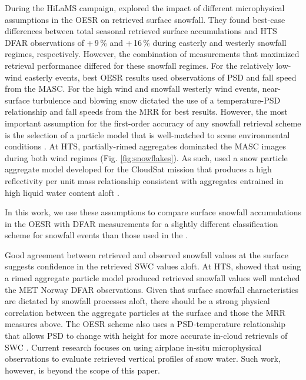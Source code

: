 \documentclass{ametsocV5}
\begin{document}
		
		During the HiLaMS campaign, \citet{schirle_estimation_2019} explored the impact of different microphysical assumptions in the OESR on retrieved surface snowfall. They found best-case differences between total seasonal retrieved surface accumulations and HTS DFAR observations of +\,9\,\% and +\,16\,\% during easterly and westerly snowfall regimes, respectively. However, the combination of measurements that maximized retrieval performance differed for these snowfall regimes. For the relatively low-wind easterly events, best OESR results used observations of PSD and fall speed from the MASC. For the high wind and snowfall westerly wind events, near-surface turbulence and blowing snow dictated the use of a temperature-PSD relationship and fall speeds from the MRR for best results. However, the most important assumption for the first-order accuracy of any snowfall retrieval scheme is the selection of a particle model that is well-matched to scene environmental conditions \citep{cooper_variational_2017,schirle_estimation_2019}. At HTS, partially-rimed aggregates dominated the MASC images during both wind regimes (Fig. \ref{fig:snowflakes}). As such, \citet{schirle_estimation_2019} used a snow particle aggregate model developed for the CloudSat mission that produces a high reflectivity per unit mass relationship consistent with aggregates entrained in high liquid water content aloft \citep{wood_microphysical_2015}.
		
		In this work, we use these assumptions to compare surface snowfall accumulations in the OESR with DFAR measurements for a slightly different classification scheme for snowfall events than those used in the \citet{schirle_estimation_2019}. 
		
		Good agreement between retrieved and observed snowfall values at the surface suggests confidence in the retrieved SWC values aloft. At HTS, \citet{schirle_estimation_2019} showed that using a rimed aggregate particle model produced retrieved snowfall values well matched the MET Norway DFAR observations. Given that surface snowfall characteristics are dictated by snowfall processes aloft, there should be a strong physical correlation between the aggregate particles at the surface and those the MRR measures above. The OESR scheme also uses a PSD-temperature relationship that allows PSD to change with height for more accurate in-cloud retrievals of SWC \citep{wood_estimation_2011}. Current research focuses on using airplane in-situ microphysical observations to evaluate retrieved vertical profiles of snow water. Such work, however, is beyond the scope of this paper.
	
\end{document}
